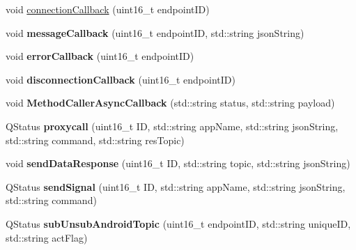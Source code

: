 \begin{DoxyCompactItemize}
\item 
void \hyperlink{classmqttBusObject_aff0cc7cb2061522a8f21c3c02550c2de}{connection\+Callback} (uint16\+\_\+t endpoint\+ID)
\item 
void {\bfseries message\+Callback} (uint16\+\_\+t endpoint\+ID, std\+::string json\+String)\hypertarget{classmqttBusObject_a01ebd62a56b40bbde78defacb4b4fe41}{}\label{classmqttBusObject_a01ebd62a56b40bbde78defacb4b4fe41}

\item 
void {\bfseries error\+Callback} (uint16\+\_\+t endpoint\+ID)\hypertarget{classmqttBusObject_ace2c91e900ebccfaa771cefac1e25364}{}\label{classmqttBusObject_ace2c91e900ebccfaa771cefac1e25364}

\item 
void {\bfseries disconnection\+Callback} (uint16\+\_\+t endpoint\+ID)\hypertarget{classmqttBusObject_aab8ee688fc9dce5626f0c3b5d40f9cc6}{}\label{classmqttBusObject_aab8ee688fc9dce5626f0c3b5d40f9cc6}

\item 
void {\bfseries Method\+Caller\+Async\+Callback} (std\+::string status, std\+::string payload)\hypertarget{classmqttBusObject_a420c6713f1e2829c25624975f5d1bd14}{}\label{classmqttBusObject_a420c6713f1e2829c25624975f5d1bd14}

\item 
Q\+Status {\bfseries proxycall} (uint16\+\_\+t ID, std\+::string app\+Name, std\+::string json\+String, std\+::string command, std\+::string res\+Topic)\hypertarget{classmqttBusObject_af5811f8c9caff114e993d0a0417dcdad}{}\label{classmqttBusObject_af5811f8c9caff114e993d0a0417dcdad}

\item 
void {\bfseries send\+Data\+Response} (uint16\+\_\+t ID, std\+::string topic, std\+::string json\+String)\hypertarget{classmqttBusObject_ab678fbb4aec7715e14a4bc56afb35b00}{}\label{classmqttBusObject_ab678fbb4aec7715e14a4bc56afb35b00}

\item 
Q\+Status {\bfseries send\+Signal} (uint16\+\_\+t ID, std\+::string app\+Name, std\+::string json\+String, std\+::string command)\hypertarget{classmqttBusObject_a47bc33c315d4a7f8c4097910143f9e4e}{}\label{classmqttBusObject_a47bc33c315d4a7f8c4097910143f9e4e}

\item 
Q\+Status {\bfseries sub\+Unsub\+Android\+Topic} (uint16\+\_\+t endpoint\+ID, std\+::string unique\+ID, std\+::string act\+Flag)\hypertarget{classmqttBusObject_ab4100f69c3df2d7e9564b4c4b8a0623d}{}\label{classmqttBusObject_ab4100f69c3df2d7e9564b4c4b8a0623d}


\end{DoxyCompactItemize}
